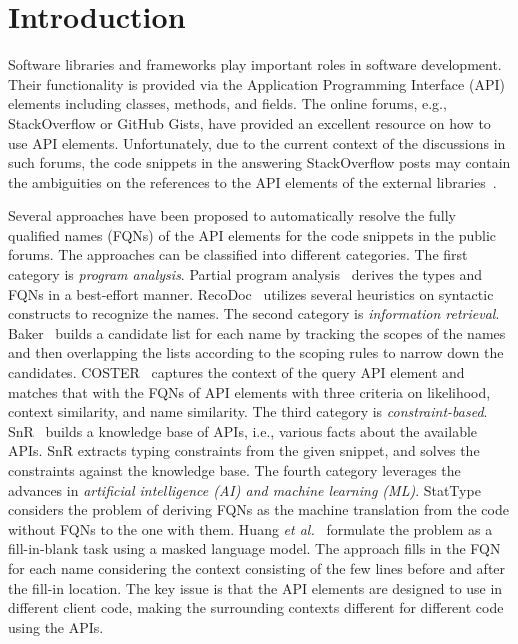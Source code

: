\section{Introduction}
\label{sec:intro}

Software libraries and frameworks play important roles in software
development. Their functionality is provided via the Application
Programming Interface (API) elements including classes, methods, and
fields. The online forums, e.g., StackOverflow or GitHub Gists, have
provided an excellent resource on how to use API
elements. Unfortunately, due to the current context of the discussions
in such forums, the code snippets in the answering StackOverflow posts
may contain the ambiguities on the references to the API elements of
the external libraries~\cite{liveapi14}.

Several approaches have been proposed to automatically resolve the
fully qualified names (FQNs) of the API elements for the code snippets
in the public forums.  The approaches can be classified into different
categories. The first category is {\em program analysis}. Partial
program analysis~\cite{dagenais-oopsla08} derives the types and FQNs
in a best-effort manner. RecoDoc~\cite{dagenais-icse12} utilizes
several heuristics on syntactic constructs to recognize the names.
The second category is {\em information
  retrieval}. Baker~\cite{liveapi14} builds a candidate list for each
name by tracking the scopes of the names and then overlapping the
lists according to the scoping rules to narrow down the candidates.
COSTER~\cite{coster-ase19} captures the context of the query API
element and matches that with the FQNs of API elements with three
criteria on likelihood, context similarity, and name similarity.  The
third category is {\em constraint-based}.  SnR~\cite{snr-icse22}
builds a knowledge base of APIs, i.e., various facts about the
available APIs.  SnR extracts typing constraints from the given
snippet, and solves the constraints against the knowledge base. The
fourth category leverages the advances in {\em artificial intelligence
  (AI) and machine learning (ML)}. StatType considers the problem of
deriving FQNs as the machine translation from the code without FQNs to
the one with them. Huang {\em et al.}~\cite{prompt-ase22} formulate
the problem as a fill-in-blank task using a masked language model. The
approach fills in the FQN for each name considering the context
consisting of the few lines before and after the fill-in location.
The key issue is that the API elements are designed to use in
different client code, making the surrounding contexts different for
different code using the APIs.

